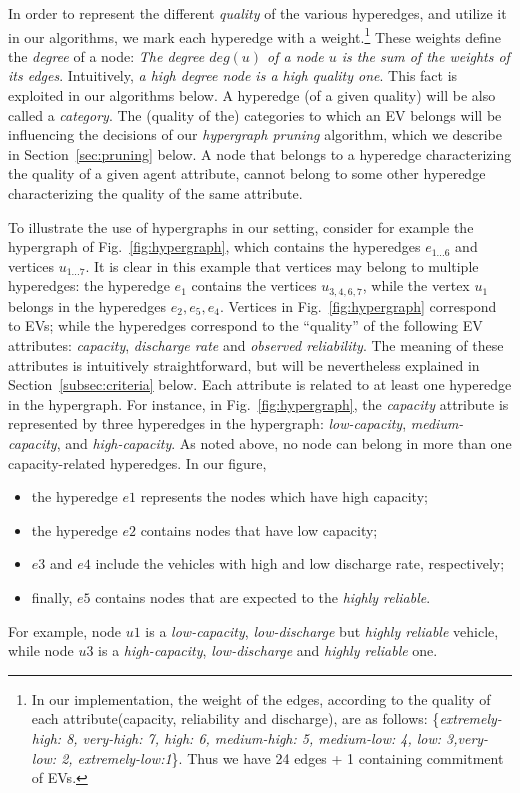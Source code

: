 In order to represent the different {\em quality} of the various hyperedges, and utilize it in our algorithms, we mark each hyperedge with a weight.\footnote{In our implementation, the weight of the edges, according to the quality of each attribute(capacity, reliability and discharge), are as follows: \{\textit{extremely-high: 8, very-high: 7, high: 6, medium-high: 5, medium-low: 4, low: 3,very-low: 2, extremely-low:1}\}. Thus we have 24 edges + 1 containing commitment of EVs.} These weights define the \textit{degree} of a node: {\em The degree $deg(u)$ 
	of a node 
	$u$ 
	is the sum of the weights of its edges}. Intuitively, {\em a high degree node is a high quality one}. This fact is exploited in our algorithms below.
A hyperedge (of a given quality) will be also called a {\em category}. The (quality of the) categories to which an EV belongs will be influencing the decisions of our {\em hypergraph pruning} algorithm, which we describe in Section~\ref{sec:pruning} below. A node that belongs to a hyperedge characterizing the quality of a given agent attribute, cannot belong to some other hyperedge characterizing the quality of the same attribute.


To illustrate the use of hypergraphs in our setting, consider for example the hypergraph of Fig.~\ref{fig:hypergraph}, which contains the hyperedges $e_{1...6}$ and vertices $u_{1...7}$. It is clear in this example that vertices may belong to multiple hyperedges: the hyperedge $e_1$ contains the vertices $u_{3,4,6,7}$, while the vertex $u_1$ belongs in the hyperedges $e_2, e_5, e_4$. Vertices in Fig.~\ref{fig:hypergraph} correspond to EVs; while the hyperedges correspond to the ``quality'' of the following EV attributes: \textit{capacity}, {\em discharge rate} and \textit{observed reliability}. The meaning of these attributes is intuitively straightforward, but will be nevertheless explained in Section~\ref{subsec:criteria} below. Each attribute is related to at least one hyperedge in the hypergraph. For instance, in Fig.~\ref{fig:hypergraph}, the {\em capacity} attribute is represented by three hyperedges in the hypergraph: {\em low-capacity}, {\em medium-capacity}, and {\em high-capacity}. As noted above, no node can belong in more than one capacity-related hyperedges. In our figure, 
\begin{itemize}
	\item the hyperedge $e1$ represents the nodes which have high capacity;
	\item the hyperedge $e2$ contains nodes that have low capacity;
	\item $e3$ and $e4$ include the vehicles with high and low discharge rate, respectively;
	\item finally, $e5$ contains nodes that are expected to the {\em highly reliable}.
\end{itemize}
For example, node $u1$ is a {\em low-capacity}, {\em low-discharge} but {\em highly reliable} vehicle, while node $u3$ is a {\em high-capacity}, {\em low-discharge} and {\em highly reliable} one.

